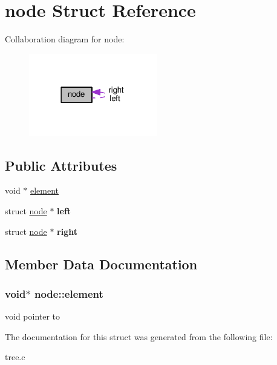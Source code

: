 \hypertarget{structnode}{}\section{node Struct Reference}
\label{structnode}


Collaboration diagram for node\+:
\nopagebreak
\begin{figure}[H]
\begin{center}
\leavevmode
\includegraphics[width=158pt]{structnode__coll__graph}
\end{center}
\end{figure}
\subsection*{Public Attributes}
\begin{DoxyCompactItemize}
\item 
void $\ast$ \hyperlink{structnode_a3cbe5eca4f32f35778d638fb8ba4a129}{element}
\item 
struct \hyperlink{structnode}{node} $\ast$ {\bfseries left}\hypertarget{structnode_a3ce38490a651bfda86d88ff955e96abc}{}\label{structnode_a3ce38490a651bfda86d88ff955e96abc}

\item 
struct \hyperlink{structnode}{node} $\ast$ {\bfseries right}\hypertarget{structnode_a875f75abfe22103500535b179828e4e3}{}\label{structnode_a875f75abfe22103500535b179828e4e3}

\end{DoxyCompactItemize}


\subsection{Member Data Documentation}
\subsubsection[{\texorpdfstring{element}{element}}]{\setlength{\rightskip}{0pt plus 5cm}void$\ast$ node\+::element}\hypertarget{structnode_a3cbe5eca4f32f35778d638fb8ba4a129}{}\label{structnode_a3cbe5eca4f32f35778d638fb8ba4a129}
void pointer to 

The documentation for this struct was generated from the following file\+:\begin{DoxyCompactItemize}
\item 
tree.\+c\end{DoxyCompactItemize}

